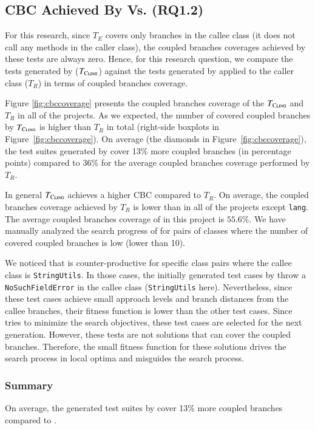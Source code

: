 \subsection{CBC Achieved By \cling Vs. \evosuite (RQ1.2)}
For this research, since $T_E$ covers only branches in the callee class (\ie it does not call any methods in the caller class), the coupled branches coverages achieved by these tests are always zero. 
Hence, for this research question, we compare the tests generated by \cling ($T_{\textsc{Cling}}$) against the tests generated by \evosuite applied to the caller class ($T_R$) in terms of coupled branches coverage. 

Figure \ref{fig:cbccoverage} presents the coupled branches coverage of the $T_{\textsc{Cling}}$ and $T_{R}$ in all of the projects. As we expected, the number of covered coupled branches by $T_{\textsc{Cling}}$ is higher than $T_{R}$ in total (right-side boxplots in Figure~\ref{fig:cbccoverage}). On average (the diamonds in Figure~\ref{fig:cbccoverage}), the test suites generated by \cling cover 13\% more coupled branches (in percentage points) compared to 36\% for the average coupled branches coverage performed by $T_{R}$.


In general $T_{\textsc{Cling}}$ achieves a higher CBC compared to $T_{R}$. On average, the coupled branches coverage achieved by $T_{R}$ is lower than \cling in all of the projects except \texttt{lang}. The average coupled branches coverage of \evosuite in this project is $55.6\%$. We have manually analyzed the search progress of \cling  for pairs of classes where the number of covered coupled branches is low (\ie lower than 10). 

We noticed that \cling is counter-productive for specific class pairs where the callee class is \texttt{StringUtils}. In those cases, the initially generated test cases by \cling throw a \texttt{NoSuchFieldError} in the callee class (\texttt{StringUtils} here). Nevertheless, since these test cases achieve small approach levels and branch distances from the callee branches, their fitness function is lower than the other test cases. Since \cling tries to minimize the search objectives, these test cases are selected for the next generation. However, these tests are not solutions that can cover the coupled branches. Therefore, the small fitness function for these solutions drives the search process in local optima and misguides the search process.
 

\subsubsection{Summary}
On average, the generated test suites by \cling cover 13\% more coupled branches compared to \evosuite. 

